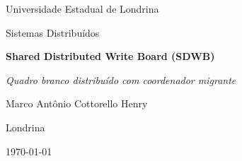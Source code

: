 \begin{titlepage}
  \centering
  \vspace*{2cm}
  {\Large Universidade Estadual de Londrina \par}
  \vspace{0.4cm}
  {\large Sistemas Distribuídos \par}
  \vspace{3cm}
  {\Huge\bfseries Shared Distributed Write Board (SDWB) \par}
  \vspace{0.6cm}
  {\Large\itshape Quadro branco distribuído com coordenador migrante \par}
  \vspace{2cm}
  {\Large Marco Antônio Cottorello Henry \par}
  \vfill
  {\large Londrina \par}
  {\Large \today \par}
\end{titlepage}
